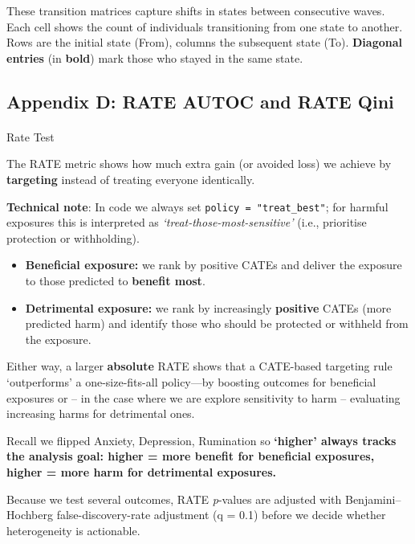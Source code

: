 \documentclass[
  single column]{article}
\makeatletter
\let\oldparagraph\paragraph
\renewcommand{\paragraph}{
    \@ifstar
      \xxxParagraphStar
      \xxxParagraphNoStar
  }
\newcommand{\xxxParagraphStar}[1]{\oldparagraph*{#1}\mbox{}}
\newcommand{\xxxParagraphNoStar}[1]{\oldparagraph{#1}\mbox{}}
\providecommand{\tightlist}{%
  \setlength{\itemsep}{0pt}\setlength{\parskip}{0pt}}
\makeatother
\begin{document}
These transition matrices capture shifts in states between consecutive
waves. Each cell shows the count of individuals transitioning from one
state to another. Rows are the initial state (From), columns the
subsequent state (To). \textbf{Diagonal entries} (in \textbf{bold}) mark
those who stayed in the same state.

\newpage{}

\subsection{Appendix D: RATE AUTOC and RATE Qini}\label{appendix-rate}

\paragraph{Rate Test}\label{rate-test}

The RATE metric shows how much extra gain (or avoided loss) we achieve
by \textbf{targeting} instead of treating everyone identically.

\textbf{Technical note}: In code we always set
\texttt{policy\ =\ "treat\_best"}; for harmful exposures this is
interpreted as \emph{`treat-those-most-sensitive'} (i.e., prioritise
protection or withholding).

\begin{itemize}
\tightlist
\item
  \textbf{Beneficial exposure:} we rank by positive CATEs and deliver
  the exposure to those predicted to \textbf{benefit most}.
\item
  \textbf{Detrimental exposure:} we rank by increasingly
  \textbf{positive} CATEs (more predicted harm) and identify those who
  should be protected or withheld from the exposure.
\end{itemize}

Either way, a larger \textbf{absolute} RATE shows that a CATE-based
targeting rule `outperforms' a one-size-fits-all policy---by boosting
outcomes for beneficial exposures or -- in the case where we are explore
sensitivity to harm -- evaluating increasing harms for detrimental ones.

Recall we flipped Anxiety, Depression, Rumination so \textbf{`higher'
always tracks the analysis goal: higher = more benefit for beneficial
exposures, higher = more harm for detrimental exposures.}

Because we test several outcomes, RATE \emph{p}-values are adjusted with
Benjamini--Hochberg false-discovery-rate adjustment (q = 0.1) before we
decide whether heterogeneity is actionable.
\end{document}

